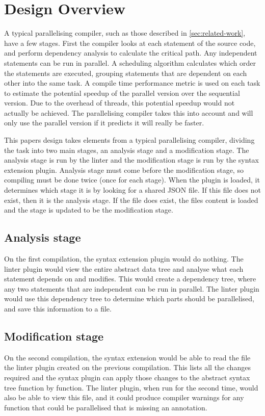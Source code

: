 \documentclass[conference]{IEEEtran}
\begin{document}
\section{Design Overview}
\label{sec:design}
A typical parallelising compiler, such as those described in \autoref{sec:related-work}, have a few stages. First the compiler looks at each statement of the source code, and perform dependency analysis to calculate the critical path. Any independent statements can be run in parallel. A scheduling algorithm calculates which order the statements are executed, grouping statements that are dependent on each other into the same task. A compile time performance metric is used on each task to estimate the potential speedup of the parallel version over the sequential version. Due to the overhead of threads, this potential speedup would not actually be achieved. The parallelising compiler takes this into account and will only use the parallel version if it predicts it will really be faster.

This papers design takes elements from a typical parallelising compiler, dividing the task into two main stages, an analysis stage and a modification stage. The analysis stage is run by the linter and the modification stage is run by the syntax extension plugin. Analysis stage must come before the modification stage, so compiling must be done twice (once for each stage).
When the plugin is loaded, it determines which stage it is by looking for a shared JSON file. If this file does not exist, then it is the analysis stage. If the file does exist, the files content is loaded and the stage is updated to be the modification stage.

\subsection{Analysis stage}
On the first compilation, the syntax extension plugin would do nothing. The linter plugin would view the entire abstract data tree and analyse what each statement depends on and modifies. This would create a dependency tree, where any two statements that are independent can be run in parallel. The linter plugin would use this dependency tree to determine which parts should be parallelised, and save this information to a file.



\subsection{Modification stage}
On the second compilation, the syntax extension would be able to read the file the linter plugin created on the previous compilation. This lists all the changes required and the syntax plugin can apply those changes to the abstract syntax tree function by function. The linter plugin, when run for the second time, would also be able to view this file, and it could produce compiler warnings for any function that could be parallelised that is missing an annotation.
\end{document}
